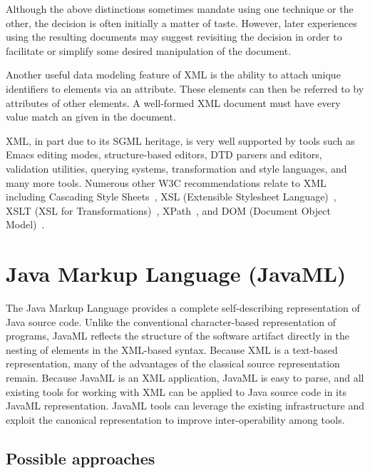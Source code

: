 \documentclass{article}
\begin{document}
\begin{multicols}{2}
\begin{itemize}
\end{itemize}

Although the above distinctions sometimes mandate using one technique or
the other, the decision is often initially a matter of taste.  However,
later experiences using the resulting documents may suggest revisiting
the decision in order to facilitate or simplify some desired
manipulation of the document.

Another useful data modeling feature of XML is the ability to attach
unique identifiers to elements via an  attribute.  These
elements can then be referred to by  attributes of other
elements.  A well-formed XML document must have every 
value match an  given in the document.

XML, in part due to its SGML heritage, is very well supported by tools
such as Emacs editing modes, structure-based editors, DTD parsers and
editors, validation utilities, querying systems, transformation and
style languages, and many more tools.  Numerous other W3C
recommendations relate to XML including Cascading Style
Sheets~\cite{CSS2}, XSL (Extensible Stylesheet Language)~\cite{XSL},
XSLT (XSL for Transformations)~\cite{XSLT}, XPath~\cite{XPath}, and DOM
(Document Object Model)~\cite{DOM}.

\section{Java Markup Language (JavaML)}
\label{sec-javaml}

The Java Markup Language provides a complete self-describing
representation of Java source code.  Unlike the conventional
character-based representation of programs, JavaML reflects the
structure of the software artifact directly in the nesting of elements
in the XML-based syntax.  Because XML is a text-based representation,
many of the advantages of the classical source representation remain.
Because JavaML is an XML application, JavaML is easy to parse, and all
existing tools for working with XML can be applied to Java source code
in its JavaML representation.  JavaML tools can leverage the existing
infrastructure and exploit the canonical representation to improve
inter-operability among tools.

\subsection{Possible approaches}


\end{multicols}
\end{document}
